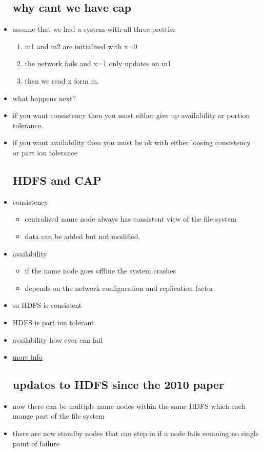\documentclass{article}
\begin{document}
\begin{itemize}
\subsection{why cant we have cap}
\item assume that we had a system with all three pretties
\begin{enumerate}
    \item m1 and m2 are initialized with x=0
    \item the network fails and x=1 only updates on m1 
    \item then we read x form m. 
\end{enumerate}
\item what happens next? 
\item if you want consistency then you must either give up availability or portion tolerance.
\item if you want availability then you must be ok with either loosing consistency or part ion tolerance 
\subsection{HDFS and CAP}
\item consistency 
\begin{itemize}
    \item centralized name node always has consistent view of the file system
    \item data can be added but not modified. 
\end{itemize}
\item availability
\begin{itemize}
    \item if the name node goes offline the system crashes 
\end{itemize}
\begin{itemize}
    \item depends on the network configuration and replication factor
\end{itemize}
\item so HDFS is consistent  
\item HDFS is part ion tolerant
\item availability how ever can fail
\item \href{https://stackoverflow.com/questions/58796173/how-does-the-cap-theorem-apply-on-hdfs}{more info}
\subsection{updates to HDFS since the 2010 paper}
\item now there can be multiple name nodes within the same HDFS which each mange part of the file system 
\item there are now standby nodes that can step in if a node fails emaning no single point of failure 
\itme 

\end{itemize}
\end{document}
